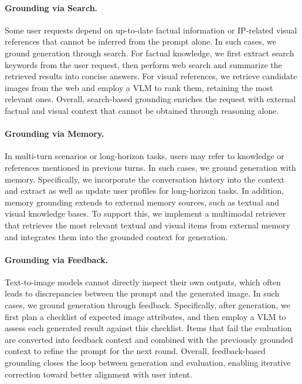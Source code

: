 \documentclass{llmxive}
\begin{document}
\paragraph{Grounding via Search.}
Some user requests depend on up-to-date factual information or IP-related visual references that cannot be inferred from the prompt alone. In such cases, we ground generation through search. For factual knowledge, we first extract search keywords from the user request, then perform web search and summarize the retrieved results into concise answers. For visual references, we retrieve candidate images from the web and employ a VLM to rank them, retaining the most relevant ones. Overall, search-based grounding enriches the request with external factual and visual context that cannot be obtained through reasoning alone.

\paragraph{Grounding via Memory.}
In multi-turn scenarios or long-horizon tasks, users may refer to knowledge or references mentioned in previous turns. In such cases, we ground generation with memory. Specifically, we incorporate the conversation history into the context and extract as well as update user profiles for long-horizon tasks. In addition, memory grounding extends to external memory sources, such as textual and visual knowledge bases. To support this, we implement a multimodal retriever that retrieves the most relevant textual and visual items from external memory and integrates them into the grounded context for generation.

\paragraph{Grounding via Feedback.}
Text-to-image models cannot directly inspect their own outputs, which often leads to discrepancies between the prompt and the generated image. In such cases, we ground generation through feedback. Specifically, after generation, we first plan a checklist of expected image attributes, and then employ a VLM to assess each generated result against this checklist. Items that fail the evaluation are converted into feedback context and combined with the previously grounded context to refine the prompt for the next round. Overall, feedback-based grounding closes the loop between generation and evaluation, enabling iterative correction toward better alignment with user intent.
\end{document}
